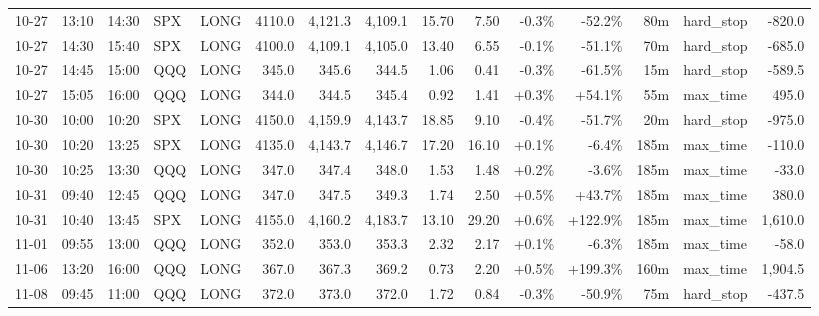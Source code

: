 \documentclass[11pt,a4paper,twoside]{article}
\begin{document}
\begin{landscape}
\begin{center}
\begin{longtable}{>{\color{txtmain}}l l l l l r r r r r r r r >{\color{txtmain}}l r}
10-27 & 13:10 & 14:30 & SPX & LONG & 4110.0 & 4,121.3 & 4,109.1 & 15.70 & 7.50 & \textcolor{lossred}{-0.3\%} & \textcolor{lossred}{-52.2\%} & 80m & hard\_stop & \textcolor{lossred}{-820.0} \\
10-27 & 14:30 & 15:40 & SPX & LONG & 4100.0 & 4,109.1 & 4,105.0 & 13.40 & 6.55 & \textcolor{lossred}{-0.1\%} & \textcolor{lossred}{-51.1\%} & 70m & hard\_stop & \textcolor{lossred}{-685.0} \\
10-27 & 14:45 & 15:00 & QQQ & LONG & 345.0 & 345.6 & 344.5 & 1.06 & 0.41 & \textcolor{lossred}{-0.3\%} & \textcolor{lossred}{-61.5\%} & 15m & hard\_stop & \textcolor{lossred}{-589.5} \\
10-27 & 15:05 & 16:00 & QQQ & LONG & 344.0 & 344.5 & 345.4 & 0.92 & 1.41 & \textcolor{wingreen}{+0.3\%} & \textcolor{wingreen}{+54.1\%} & 55m & max\_time & \textcolor{wingreen}{495.0} \\
10-30 & 10:00 & 10:20 & SPX & LONG & 4150.0 & 4,159.9 & 4,143.7 & 18.85 & 9.10 & \textcolor{lossred}{-0.4\%} & \textcolor{lossred}{-51.7\%} & 20m & hard\_stop & \textcolor{lossred}{-975.0} \\
10-30 & 10:20 & 13:25 & SPX & LONG & 4135.0 & 4,143.7 & 4,146.7 & 17.20 & 16.10 & \textcolor{wingreen}{+0.1\%} & \textcolor{lossred}{-6.4\%} & 185m & max\_time & \textcolor{lossred}{-110.0} \\
10-30 & 10:25 & 13:30 & QQQ & LONG & 347.0 & 347.4 & 348.0 & 1.53 & 1.48 & \textcolor{wingreen}{+0.2\%} & \textcolor{lossred}{-3.6\%} & 185m & max\_time & \textcolor{lossred}{-33.0} \\
10-31 & 09:40 & 12:45 & QQQ & LONG & 347.0 & 347.5 & 349.3 & 1.74 & 2.50 & \textcolor{wingreen}{+0.5\%} & \textcolor{wingreen}{+43.7\%} & 185m & max\_time & \textcolor{wingreen}{380.0} \\
10-31 & 10:40 & 13:45 & SPX & LONG & 4155.0 & 4,160.2 & 4,183.7 & 13.10 & 29.20 & \textcolor{wingreen}{+0.6\%} & \textcolor{wingreen}{+122.9\%} & 185m & max\_time & \textcolor{wingreen}{1,610.0} \\
11-01 & 09:55 & 13:00 & QQQ & LONG & 352.0 & 353.0 & 353.3 & 2.32 & 2.17 & \textcolor{wingreen}{+0.1\%} & \textcolor{lossred}{-6.3\%} & 185m & max\_time & \textcolor{lossred}{-58.0} \\
11-06 & 13:20 & 16:00 & QQQ & LONG & 367.0 & 367.3 & 369.2 & 0.73 & 2.20 & \textcolor{wingreen}{+0.5\%} & \textcolor{wingreen}{+199.3\%} & 160m & max\_time & \textcolor{wingreen}{1,904.5} \\
11-08 & 09:45 & 11:00 & QQQ & LONG & 372.0 & 373.0 & 372.0 & 1.72 & 0.84 & \textcolor{lossred}{-0.3\%} & \textcolor{lossred}{-50.9\%} & 75m & hard\_stop & \textcolor{lossred}{-437.5} \\

\end{longtable}
\end{center}
\end{landscape}
\end{document}
